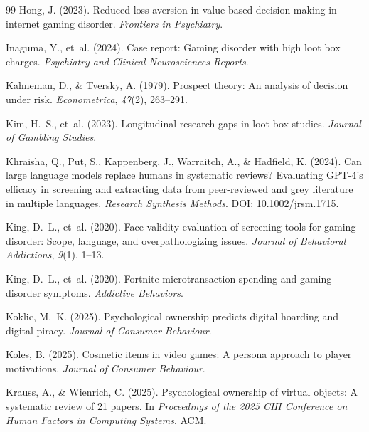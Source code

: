 \documentclass[12pt]{article}
\begin{document}
\begin{thebibliography}{99}
Hong, J. (2023).
\newblock Reduced loss aversion in value-based decision-making in internet gaming disorder.
\newblock \textit{Frontiers in Psychiatry}.

Inaguma, Y., et~al. (2024).
\newblock Case report: Gaming disorder with high loot box charges.
\newblock \textit{Psychiatry and Clinical Neurosciences Reports}.

Kahneman, D., \& Tversky, A. (1979).
\newblock Prospect theory: An analysis of decision under risk.
\newblock \textit{Econometrica}, \textit{47}(2), 263--291.

Kim, H.~S., et~al. (2023).
\newblock Longitudinal research gaps in loot box studies.
\newblock \textit{Journal of Gambling Studies}.

Khraisha, Q., Put, S., Kappenberg, J., Warraitch, A., \& Hadfield, K. (2024).
\newblock Can large language models replace humans in systematic reviews? Evaluating GPT-4's efficacy in screening and extracting data from peer-reviewed and grey literature in multiple languages.
\newblock \textit{Research Synthesis Methods}. DOI: 10.1002/jrsm.1715.

King, D.~L., et~al. (2020).
\newblock Face validity evaluation of screening tools for gaming disorder: Scope, language, and overpathologizing issues.
\newblock \textit{Journal of Behavioral Addictions}, \textit{9}(1), 1--13.

King, D.~L., et~al. (2020).
\newblock Fortnite microtransaction spending and gaming disorder symptoms.
\newblock \textit{Addictive Behaviors}.

Koklic, M.~K. (2025).
\newblock Psychological ownership predicts digital hoarding and digital piracy.
\newblock \textit{Journal of Consumer Behaviour}.

Koles, B. (2025).
\newblock Cosmetic items in video games: A persona approach to player motivations.
\newblock \textit{Journal of Consumer Behaviour}.

Krauss, A., \& Wienrich, C. (2025).
\newblock Psychological ownership of virtual objects: A systematic review of 21 papers.
\newblock In \textit{Proceedings of the 2025 CHI Conference on Human Factors in Computing Systems}. ACM.


\end{thebibliography}
\end{document}
